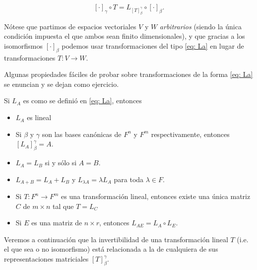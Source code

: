 \[
[\cdot]_{\gamma} \circ T = L_{[T]_{\beta}^{\gamma}} \circ [\cdot]_{\beta}.
\]

Nótese que partimos de espacios vectoriales $V$ y $W$ \textit{arbitrarios}
(siendo la única condición impuesta el que ambos sean finito dimensionales),
y que gracias a los isomorfismos $[\cdot]_{\beta}$ podemos 
usar transformaciones del tipo \eqref{eq: La} en lugar
de transformaciones $T: V \longrightarrow W$.

Algunas propiedades fáciles de probar sobre transformaciones
de la forma \eqref{eq: La} se enuncian y se dejan como ejercicio.
\begin{prop}
Si $L_{A}$ es como se definió en \eqref{eq: La}, entonces
\begin{itemize}
	\item $L_{A}$ es lineal
	\item Si $\beta$ y $\gamma$ son las bases canónicas de
	$F^{n}$ y $F^{m}$ respectivamente, entonces $[L_{A}]_{\beta}^{\gamma} = A$.
	\item $L_{A} = L_{B}$ si y sólo si $A = B$.
	\item $L_{A + B} = L_{A} + L_{B}$ y $L_{\lambda A} = \lambda L_{A}$
	para toda $\lambda \in F$.
	\item Si $T: F^{n} \longrightarrow F^{m}$ es una transformación lineal,
	entonces existe una única matriz $C$ de $m \times n$ tal que 
	$T = L_{C}$
	\item Si $E$ es una matriz de $n \times r$, entonces
	$L_{AE} = L_{A} \circ L_{E}$.
\end{itemize} 
\end{prop}

Veremos a continuación que la invertibilidad de 
una transformación lineal
$T$ (i.e. el que sea o no isomorfismo) está 
relacionada a la de cualquiera de sus representaciones matriciales
$[T]_{\beta}^{\gamma}$.

